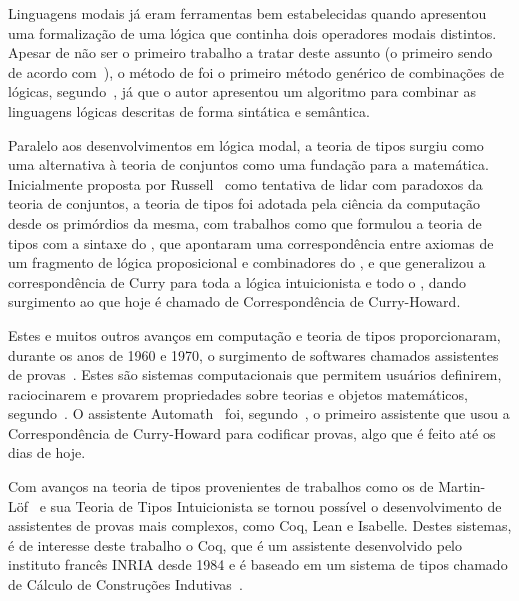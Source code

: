 	Linguagens modais já eram ferramentas bem estabelecidas quando  apresentou uma formalização
	de uma lógica que continha dois operadores modais distintos. Apesar de não ser o primeiro trabalho a tratar deste assunto (o primeiro sendo
	~ de acordo com~), o método de  foi o primeiro
	método genérico de combinações de lógicas, segundo~, já que o autor apresentou
	um algoritmo para combinar as linguagens lógicas descritas de forma sintática e semântica.

	Paralelo aos desenvolvimentos em lógica modal, a teoria de tipos surgiu como uma alternativa à teoria de conjuntos como uma fundação para
	a matemática. Inicialmente proposta por Russell~\cite{russell1903principles} como tentativa de lidar com paradoxos da teoria de conjuntos,
	a teoria de tipos foi adotada pela ciência da computação desde os primórdios da mesma, com trabalhos como 
	que formulou a teoria de tipos com a sintaxe do \CalcLambda,  que
	apontaram uma correspondência entre axiomas de um fragmento de lógica proposicional e combinadores do \CalcLambda, e 
	que generalizou a correspondência de Curry para toda a lógica intuicionista e todo o \CalcLambda, dando surgimento ao que hoje é chamado
	de Correspondência de Curry-Howard.

	Estes e muitos outros avanços em computação e teoria de tipos proporcionaram, durante os anos de 1960 e 1970, o surgimento de softwares chamados
	assistentes de provas~\cite{harrison2014history}. Estes são sistemas computacionais que permitem usuários definirem, raciocinarem e provarem
	propriedades sobre teorias e objetos matemáticos, segundo~. O assistente Automath~\cite{debruijn1980survey} foi,
	segundo~, o primeiro assistente que usou a Correspondência de Curry-Howard para codificar provas,
	algo que é feito até os dias de hoje.

	\sloppy
	Com avanços na teoria de tipos provenientes de trabalhos como os de Martin-Löf~\cite{martin1975intuitionistic,martin1984intuitionistic} e sua
	Teoria de Tipos Intuicionista se tornou possível o desenvolvimento de assistentes de provas mais complexos, como Coq, Lean e Isabelle.
	Destes sistemas, é de interesse deste trabalho o Coq, que é um assistente desenvolvido pelo instituto francês INRIA desde 1984 e é
	baseado em um sistema de tipos chamado de Cálculo de Construções Indutivas~\cite{coqteam2022manual}.

